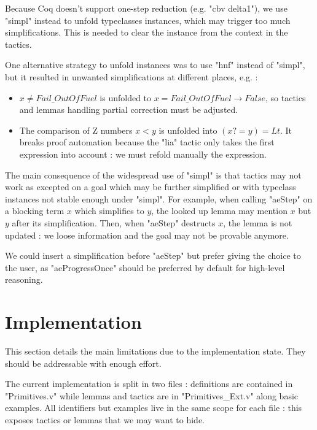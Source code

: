 \documentclass{article}
\begin{document}
\medskip

Because Coq doesn't support one-step reduction (e.g. "cbv delta1"), we use "simpl" instead to unfold typeclasses instances, which may trigger too much simplifications. This is needed to clear the instance from the context in the tactics.

One alternative strategy to unfold instances was to use "hnf" instead of "simpl", but it resulted in unwanted simplifications at different places, e.g. :
\begin{itemize}
    \item $x \ne Fail\_ OutOfFuel$ is unfolded to $x = Fail\_ OutOfFuel \rightarrow False$, so tactics and lemmas handling partial correction must be adjusted.
    \item The comparison of Z numbers $x < y$ is unfolded into $(x ?= y) = Lt$. It breaks proof automation because the "lia" tactic only takes the first expression into account : we must refold manually the expression.
\end{itemize}

The main consequence of the widespread use of "simpl" is that tactics may not work as excepted on a goal which may be further simplified or with typeclass instances not stable enough under "simpl". For example, when calling "aeStep" on a blocking term $x$ which simplifies to $y$, the looked up lemma may mention $x$ but $y$ after its simplification. Then, when "aeStep" destructs $x$, the lemma is not updated : we loose information and the goal may not be provable anymore.

We could insert a simplification before "aeStep" but prefer giving the choice to the user, as "aeProgressOnce" should be preferred by default for high-level reasoning.

\section{Implementation}
\label{sec:Implementation}

This section details the main limitations due to the implementation state. They should be addressable with enough effort.

\medskip

The current implementation is split in two files : definitions are contained in "Primitives.v" while lemmas and tactics are in "Primitives\_Ext.v" along basic examples. All identifiers but examples live in the same scope for each file : this exposes tactics or lemmas that we may want to hide.
\end{document}
